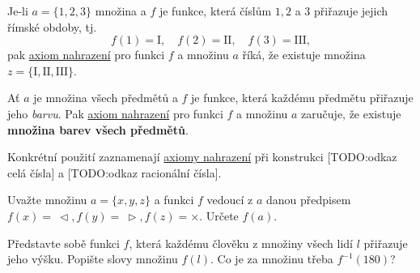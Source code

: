 \begin{example}
  \label{exam:axiom-nahrazeni-1}
  Je-li $a = \{1, 2, 3\}$ množina a $f$ je funkce, která číslům $1, 2$ a $3$
  přiřazuje jejich římské obdoby, tj.
  \[
    f(1) = \mathrm{I}, \quad f(2) = \mathrm{II}, \quad f(3) = \mathrm{III},
  \]
  pak \hyperref[eq:axiom-nahrazeni]{axiom nahrazení} pro funkci $f$ a množinu
  $a$ říká, že existuje množina $z = \{\mathrm{I}, \mathrm{II}, \mathrm{III}\}$.
\end{example}
\begin{example}
  \label{exam:axiom-nahrazeni-2}
  Ať $a$ je množina všech předmětů a $f$ je funkce, která každému předmětu
  přiřazuje jeho \emph{barvu}. Pak \hyperref[eq:axiom-nahrazeni]{axiom
  nahrazení} pro funkci $f$ a množinu $a$ zaručuje, že existuje \textbf{množina
  barev všech předmětů}.
\end{example}
Konkrétní použití zaznamenají \hyperref[eq:axiom-nahrazeni]{axiomy nahrazení}
při konstrukci [TODO:odkaz celá čísla] a [TODO:odkaz racionální čísla].

\begin{exercise}
  Uvažte množinu $a = \{x, y, z\}$ a funkci $f$ vedoucí z $a$ danou předpisem
  $f(x) =~\vartriangleleft, f(y) =~\vartriangleright, f(z) = \times$. Určete
  $f(a)$.
\end{exercise}
\lessboxspace
\begin{exercise}
  Představte sobě funkci $f$, která každému člověku z množiny všech lidí $l$
  přiřazuje jeho výšku. Popište slovy množinu $f(l)$. Co je za množinu třeba
  $f^{-1}(180)$?
\end{exercise}
